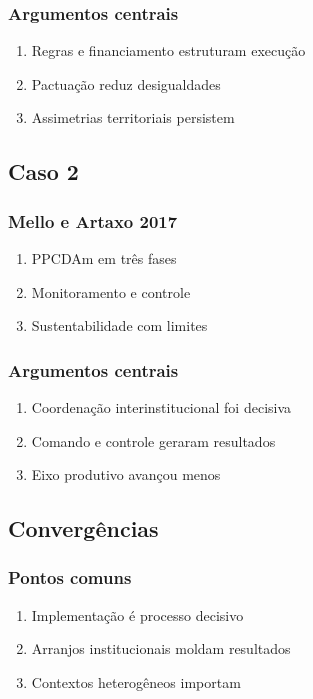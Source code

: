 \documentclass[12pt,a4paper]{article}
\begin{document}
\subsubsection{Argumentos centrais}
\label{sec:org4c1cdd0}
\begin{enumerate}
\item Regras e financiamento estruturam execução
\label{sec:orgc126377}
\item Pactuação reduz desigualdades
\label{sec:org0b42cca}
\item Assimetrias territoriais persistem
\label{sec:orgb18b576}
\end{enumerate}
\subsection{Caso 2}
\label{sec:orgb56bb0d}
\subsubsection{Mello e Artaxo 2017}
\label{sec:org1905fe8}
\begin{enumerate}
\item PPCDAm em três fases
\label{sec:org440bb43}
\item Monitoramento e controle
\label{sec:orgdcebe62}
\item Sustentabilidade com limites
\label{sec:orge8f2a5c}
\end{enumerate}
\subsubsection{Argumentos centrais}
\label{sec:orgd83eaa2}
\begin{enumerate}
\item Coordenação interinstitucional foi decisiva
\label{sec:org8e1062d}
\item Comando e controle geraram resultados
\label{sec:org0c1cfe0}
\item Eixo produtivo avançou menos
\label{sec:orgdf628a8}
\end{enumerate}
\subsection{Convergências}
\label{sec:orgf2fcf8a}
\subsubsection{Pontos comuns}
\label{sec:org7c460fa}
\begin{enumerate}
\item Implementação é processo decisivo
\label{sec:orgf258ca2}
\item Arranjos institucionais moldam resultados
\label{sec:org4c1eebd}
\item Contextos heterogêneos importam
\label{sec:orgf0c4121}
\end{enumerate}
\end{document}
